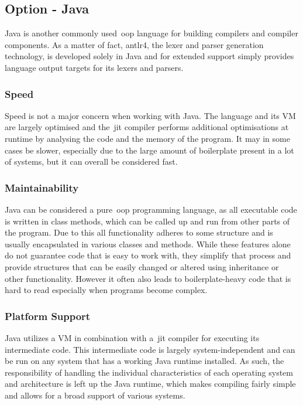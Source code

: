 \subsection{Option - Java}

Java is another commonly used~\acrshort{oop} language for building compilers and compiler components. As a matter of fact, \Gls{antlr4}, the lexer and parser generation technology, is developed solely in Java and for extended support simply provides language output targets for its lexers and parsers.

\subsubsection{Speed}

Speed is not a major concern when working with Java. The language and its VM are largely optimised and the~\acrshort{jit} compiler performs additional optimisations at runtime by analysing the code and the memory of the program. It may in some cases be slower, especially due to the large amount of boilerplate present in a lot of systems, but it can overall be considered fast.

\subsubsection{Maintainability}

Java can be considered a pure~\acrshort{oop} programming language, as all executable code is written in class methods, which can be called up and run from other parts of the program. Due to this all functionality adheres to some structure and is usually encapsulated in various classes and methods. While these features alone do not guarantee code that is easy to work with, they simplify that process and provide structures that can be easily changed or altered using inheritance or other functionality. However it often also leads to boilerplate-heavy code that is hard to read especially when programs become complex.

\subsubsection{Platform Support}

Java utilizes a VM in combination with a~\acrshort{jit} compiler for executing its intermediate code. This intermediate code is largely system-independent and can be run on any system that has a working Java runtime installed. As such, the responsibility of handling the individual characteristics of each operating system and architecture is left up the Java runtime, which makes compiling fairly simple and allows for a broad support of various systems.

